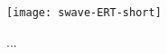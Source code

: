 \documentclass[preprint,showpacs,preprintnumbers,amsmath,amssymb]{revtex4}
\begin{document}
\begin{figure}[H]
	\centering
	\texttt{[image: swave-ERT-short]}
	\caption{...}
	\label{fig:swave-ERT-short}
\end{figure}


\end{document}

